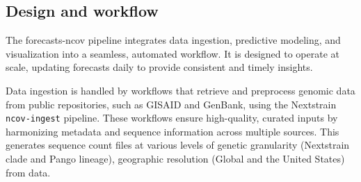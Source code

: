 


\subsection{Design and workflow}

The forecasts-ncov pipeline integrates data ingestion, predictive modeling, and visualization into a seamless, automated workflow.
It is designed to operate at scale, updating forecasts daily to provide consistent and timely insights.

Data ingestion is handled by workflows that retrieve and preprocess genomic data from public repositories, such as GISAID and GenBank, using the Nextstrain \texttt{ncov-ingest} pipeline.
These workflows ensure high-quality, curated inputs by harmonizing metadata and sequence information across multiple sources.
This generates sequence count files at various levels of genetic granularity (Nextstrain clade and Pango lineage), geographic resolution (Global and the United States) from data.

